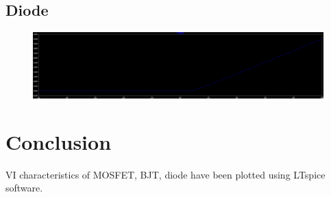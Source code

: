 \documentclass[12pt,a4paper]{report}
\begin{document}
    \subsection{Diode}
    \begin{figure}[h!]
        \centering
        \includegraphics[width=1\linewidth]{Simluations/Experiment_1/figs/diode-plot.png}
    \end{figure}
\section{Conclusion}
VI characteristics of MOSFET, BJT, diode have been plotted using LTspice software.
\end{document}
